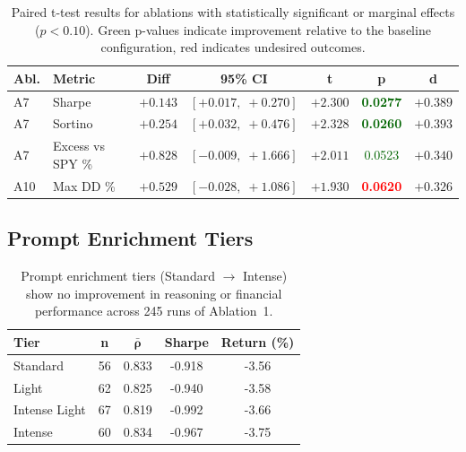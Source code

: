 \documentclass{article}
\begin{document}
\begin{table}[H]
\centering
\small
\begin{tabular}{@{}llccccc@{}}
\toprule
\textbf{Abl.} & \textbf{Metric} & \textbf{Diff} & \textbf{95\% CI} & \textbf{t} & \textbf{p} & \textbf{d} \\
\midrule
A7 & Sharpe           & $+0.143$ & $[+0.017,\; +0.270]$ & $+2.300$ & \textbf{\textcolor{darkgreen}{0.0277}} & $+0.389$ \\
A7 & Sortino          & $+0.254$ & $[+0.032,\; +0.476]$ & $+2.328$ & \textbf{\textcolor{darkgreen}{0.0260}} & $+0.393$ \\
A7 & Excess vs SPY \% & $+0.828$ & $[-0.009,\; +1.666]$ & $+2.011$ & \textcolor{darkgreen}{0.0523} & $+0.340$ \\
A10 & Max DD \%       & $+0.529$ & $[-0.028,\; +1.086]$ & $+1.930$ & \textbf{\textcolor{red}{0.0620}} & $+0.326$ \\
\bottomrule
\end{tabular}
\vspace{6pt}
\caption{Paired t-test results for ablations with statistically significant or marginal effects ($p < 0.10$). Green p-values indicate improvement relative to the baseline configuration, red indicates undesired outcomes.}
\label{tab:paired-ttests}
\end{table}

\subsection{Prompt Enrichment Tiers}
\label{app:prompt_tiers}

\begin{table}[H]
\centering
\small
\begin{tabular}{lcccc}
\toprule
\textbf{Tier} & \textbf{n} & $\boldsymbol{\bar{\rho}}$ & \textbf{Sharpe} & \textbf{Return (\%)} \\
\midrule
Standard        & 56 & 0.833 & -0.918 & -3.56 \\
Light           & 62 & 0.825 & -0.940 & -3.58 \\
Intense Light   & 67 & 0.819 & -0.992 & -3.66 \\
Intense         & 60 & 0.834 & -0.967 & -3.75 \\
\bottomrule
\end{tabular}
\vspace{4pt}
\caption{Prompt enrichment tiers (Standard $\rightarrow$ Intense) show no improvement in reasoning or financial performance across 245 runs of Ablation~1.}
\label{tab:prompt_tiers}
\end{table}
\end{document}
